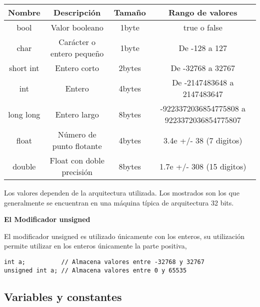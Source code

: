 \begin{center}
	\begin{tabular}{|c|c|c|c|}
		\hline
		Nombre & Descripción & Tamaño & Rango de valores\\
		\hline
		bool & Valor booleano & 1byte & true o false\\
		\hline
		char & Carácter o entero pequeño & 1byte & De -128 a 127\\
		\hline
		short int & Entero corto & 2bytes & De -32768 a 32767\\
		\hline
		int & Entero & 4bytes & De -2147483648 a 2147483647\\
		\hline
		long long & Entero largo & 8bytes & -9223372036854775808 a 9223372036854775807\\
		\hline
		float & Número de punto flotante & 4bytes & 3.4e +/- 38 (7 digitos)\\
		\hline
		double & Float con doble precisión & 8bytes & 1.7e +/- 308 (15 digitos)\\
		\hline
	\end{tabular}
\end{center}

Los valores dependen de la arquitectura utilizada. Los mostrados son los que generalmente se encuentran en una máquina típica de arquitectura 32 bits.

\textbf{El Modificador unsigned}

El modificador unsigned es utilizado únicamente con los enteros, su utilización permite utilizar en los enteros únicamente la parte positiva,

\begin{lstlisting}[style=Cpp, label=unsigned, caption=Unsigned]
int a; 			// Almacena valores entre -32768 y 32767
unsigned int a; // Almacena valores entre 0 y 65535
\end{lstlisting}


\subsection{Variables y constantes}

